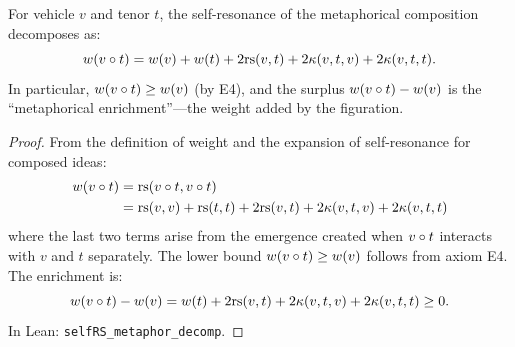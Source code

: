 \begin{theorem}
\label{thm:metaphor-selfrs}
For vehicle $v$ and tenor $t$, the self-resonance of the metaphorical composition decomposes as:
\[
  w(v \circ t) = w(v) + w(t) + 2\mathrm{rs}(v, t) + 2\kappa(v, t, v) + 2\kappa(v, t, t).
\]
In particular, $w(v \circ t) \geq w(v)$ (by E4), and the surplus $w(v \circ t) - w(v)$ is the ``metaphorical enrichment''---the weight added by the figuration.
\end{theorem}

\begin{proof}
From the definition of weight and the expansion of self-resonance for composed ideas:
\begin{align*}
  w(v \circ t) &= \mathrm{rs}(v \circ t, v \circ t) \\
  &= \mathrm{rs}(v, v) + \mathrm{rs}(t, t) + 2\mathrm{rs}(v, t) + 2\kappa(v, t, v) + 2\kappa(v, t, t)
\end{align*}
where the last two terms arise from the emergence created when $v \circ t$ interacts with $v$ and $t$ separately.  The lower bound $w(v \circ t) \geq w(v)$ follows from axiom E4.  The enrichment is:
\[
  w(v \circ t) - w(v) = w(t) + 2\mathrm{rs}(v, t) + 2\kappa(v, t, v) + 2\kappa(v, t, t) \geq 0.
\]
In Lean: \texttt{selfRS\_metaphor\_decomp}.
\end{proof}

